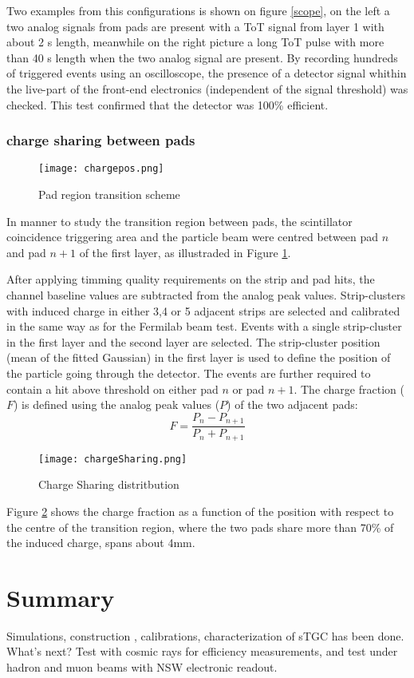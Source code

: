 Two examples from this configurations is shown on figure \ref{scope}, on the left a two analog signals from pads are
present with a ToT signal from layer 1 with about 2 \micro s length, meanwhile on the right picture a long ToT pulse with more
than 40 \micro s length when the two analog signal are present. By recording hundreds of triggered events using an
oscilloscope, the presence of a detector signal whithin the live-part of the front-end electronics (independent of the
signal threshold) was checked. This test confirmed that the detector was 100\% efficient.\par


\subsubsection{charge sharing between pads}
\begin{figure}[ht]
\centering
\texttt{[image: chargepos.png]}
\caption{Pad region transition scheme}\label{chargepos}
\end{figure}

In manner to study the transition region between pads, the scintillator coincidence triggering area and the particle
beam were centred between pad $n$ and pad $n+1$ of the first layer, as illustraded in Figure \ref{chargepos}.\par
After applying timming quality requirements on the strip and pad hits, the channel baseline values are subtracted from
the analog peak values. Strip-clusters with induced charge in either 3,4 or 5 adjacent strips are selected and
calibrated in the same way as for the Fermilab beam test. Events with a single strip-cluster in the first layer and the
second layer are selected. The strip-cluster position (mean of the fitted Gaussian) in the first layer is used to define
the position of the particle going through the detector. The events are further required to contain a hit above
threshold on either pad $n$ or pad $n+1$. The charge fraction ($F$) is defined using the analog peak values ($P$) of the two
adjacent pads:
\begin{equation}
F = \frac{P_n - P_{n+1}}{P_n + P_{n+1}}
\end{equation}

\begin{figure}[ht]
\centering
\texttt{[image: chargeSharing.png]}
\caption{Charge Sharing distritbution}\label{chargeSharing}
\end{figure}

Figure \ref{chargeSharing} shows the charge fraction as a function of the position with respect to the centre of the
transition region, where the two pads share more than 70\% of the induced charge, spans about \unit{4}{mm}.








\section{Summary}
Simulations, construction , calibrations, characterization of sTGC has been done. 
What's next? Test with cosmic rays for efficiency measurements, and test under hadron and muon beams with NSW electronic
readout. 
